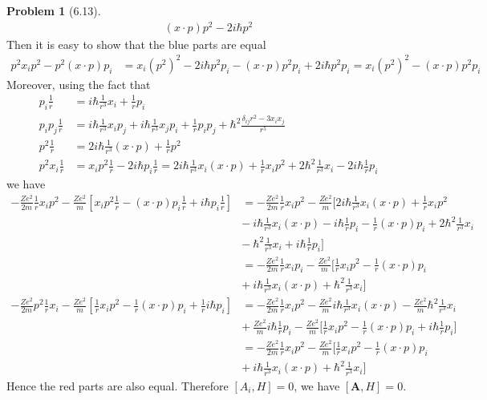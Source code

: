 \documentclass[twoside,11pt]{article}
\theoremstyle{definition}
\newtheorem{problem}{Problem}
\theoremstyle{remark}
\begin{document}
\begin{problem}[6.13]
\begin{align*}
    (x\cdot p)p^2 - 2i\hbar p^2
\end{align*}
Then it is easy to show that the blue parts are equal
\begin{align*}
    p^2x_ip^2 - p^2(x\cdot p)p_i &= 
    x_i(p^2)^2 - 2i\hbar p^2p_i 
    -(x\cdot p)p^2p_i + 2i\hbar p^2 p_i=
    x_i(p^2)^2 - (x\cdot p) p^2p_i
\end{align*}
Moreover, using the fact that
\begin{align*}
    p_i\frac{1}{r} &= i\hbar\frac{1}{r^3}x_i + \frac{1}{r}p_i\\
    p_ip_j\frac{1}{r} &= 
    i\hbar\frac{1}{r^3}x_ip_j + i\hbar\frac{1}{r^3}x_jp_i + 
    \frac{1}{r}p_ip_j + \hbar^2
    \frac{\delta_{ij}r^2 - 3x_ix_j}{r^5}\\
    p^2\frac{1}{r} &= 2i\hbar\frac{1}{r^3}(x\cdot p) + \frac{1}{r}p^2\\
    p^2x_i\frac{1}{r} &= x_ip^2\frac{1}{r} - 2i\hbar p_i\frac{1}{r}
    =2i\hbar\frac{1}{r^3}x_i(x\cdot p) + \frac{1}{r}x_ip^2
    +2\hbar^2\frac{1}{r^3}x_i - 2i\hbar\frac{1}{r}p_i
\end{align*}
we have
\begin{align*}
    -\frac{Ze^2}{2m}\frac{1}{r}x_ip^2 - 
    \frac{Ze^2}{m}[x_ip^2\frac{1}{r} - (x\cdot p)p_i\frac{1}{r}
    +i\hbar p_i\frac{1}{r}] &= 
    -\frac{Ze^2}{2m}\frac{1}{r}x_ip^2 - \frac{Ze^2}{m}\Big[
        2i\hbar\frac{1}{r^3}x_i(x\cdot p) + \frac{1}{r}x_ip^2\\
        &-\ i\hbar\frac{1}{r^3}x_i(x\cdot p) - i\hbar\frac{1}{r}p_i 
        - \frac{1}{r}(x\cdot p)p_i + 2\hbar^2\frac{1}{r^3}x_i\\
        &-\ \hbar^2\frac{1}{r^3}x_i + i\hbar\frac{1}{r}p_i
    \Big]\\
    &= -\frac{Ze^2}{2m}\frac{1}{r}x_ip_i - \frac{Ze^2}{m}\Big[
        \frac{1}{r}x_ip^2 - \frac{1}{r}(x\cdot p)p_i\\
    &+\ i\hbar\frac{1}{r^3}x_i(x\cdot p) + \hbar^2\frac{1}{r^3}x_i
    \Big]\\
    -\frac{Ze^2}{2m}p^2\frac{1}{r}x_i 
     - \frac{Ze^2}{m}[\frac{1}{r}x_ip^2 - \frac{1}{r}(x\cdot p)p_i + 
    \frac{1}{r}i\hbar p_i] &= 
    -\frac{Ze^2}{2m}\frac{1}{r}x_i p^2 - \frac{Ze^2}{m}i\hbar\frac{1}{r^3}x_i(x\cdot p)
    -\frac{Ze^2}{m}\hbar^2\frac{1}{r^3}x_i\\
    &+\ \frac{Ze^2}{m}i\hbar\frac{1}{r}p_i - \frac{Ze^2}{m}\Big[\frac{1}{r}x_ip^2 - \frac{1}{r}(x\cdot p)p_i + i\hbar\frac{1}{r}p_i\Big]\\
    &= -\frac{Ze^2}{2m}\frac{1}{r}x_ip^2 - \frac{Ze^2}{m}\Big[\frac{1}{r}x_ip^2 - \frac{1}{r}(x\cdot p)p_i\\
    &+\ i\hbar\frac{1}{r^3}x_i(x\cdot p) + \hbar^2\frac{1}{r^3}x_i\Big]
\end{align*}
Hence the red parts are also equal.
Therefore $[A_i, H] = 0$, we have $[\mathbf{A}, H] = 0$.


\end{problem}
\end{document}
